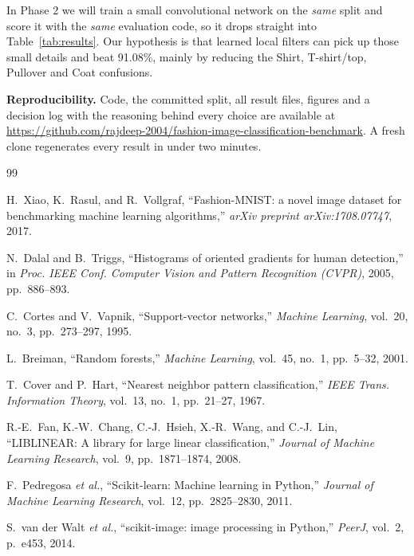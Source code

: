 \documentclass[conference]{IEEEtran}
\begin{document}
In Phase 2 we will train a small convolutional network on the \emph{same} split and score it with the \emph{same}
evaluation code, so it drops straight into Table~\ref{tab:results}. Our hypothesis is that learned local filters can pick
up those small details and beat 91.08\%, mainly by reducing the Shirt, T-shirt/top, Pullover and Coat confusions.

\textbf{Reproducibility.} Code, the committed split, all result files, figures and a decision log with the reasoning
behind every choice are available at
\url{https://github.com/rajdeep-2004/fashion-image-classification-benchmark}. A fresh clone regenerates every result in
under two minutes.

\begin{thebibliography}{99}

H.~Xiao, K.~Rasul, and R.~Vollgraf, ``Fashion-MNIST: a novel image dataset for benchmarking machine learning
algorithms,'' \emph{arXiv preprint arXiv:1708.07747}, 2017.

N.~Dalal and B.~Triggs, ``Histograms of oriented gradients for human detection,'' in \emph{Proc. IEEE Conf. Computer
Vision and Pattern Recognition (CVPR)}, 2005, pp.~886--893.

C.~Cortes and V.~Vapnik, ``Support-vector networks,'' \emph{Machine Learning}, vol.~20, no.~3, pp.~273--297, 1995.

L.~Breiman, ``Random forests,'' \emph{Machine Learning}, vol.~45, no.~1, pp.~5--32, 2001.

T.~Cover and P.~Hart, ``Nearest neighbor pattern classification,'' \emph{IEEE Trans. Information Theory}, vol.~13,
no.~1, pp.~21--27, 1967.

R.-E.~Fan, K.-W.~Chang, C.-J.~Hsieh, X.-R.~Wang, and C.-J.~Lin, ``LIBLINEAR: A library for large linear
classification,'' \emph{Journal of Machine Learning Research}, vol.~9, pp.~1871--1874, 2008.

F.~Pedregosa \emph{et al.}, ``Scikit-learn: Machine learning in Python,'' \emph{Journal of Machine Learning Research},
vol.~12, pp.~2825--2830, 2011.

S.~van der Walt \emph{et al.}, ``scikit-image: image processing in Python,'' \emph{PeerJ}, vol.~2, p.~e453, 2014.


\end{thebibliography}
\end{document}

